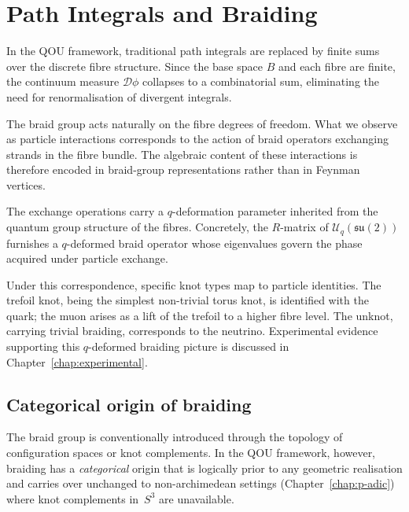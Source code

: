 \chapter{Path Integrals and Braiding}
\label{chap:path-integrals-braiding}

In the QOU framework, traditional path integrals are replaced by finite sums
over the discrete fibre structure.  Since the base space $B$ and each fibre are
finite, the continuum measure $\mathcal{D}\phi$ collapses to a combinatorial
sum, eliminating the need for renormalisation of divergent integrals.

The braid group acts naturally on the fibre degrees of freedom.  What we
observe as particle interactions corresponds to the action of braid operators
exchanging strands in the fibre bundle.  The algebraic content of these
interactions is therefore encoded in braid-group representations rather than in
Feynman vertices.

The exchange operations carry a $q$-deformation parameter inherited from the
quantum group structure of the fibres.  Concretely, the $R$-matrix of
$\mathcal{U}_q(\mathfrak{su}(2))$ furnishes a $q$-deformed braid operator
whose eigenvalues govern the phase acquired under particle exchange.

Under this correspondence, specific knot types map to particle identities.  The
trefoil knot, being the simplest non-trivial torus knot, is identified with the
quark; the muon arises as a lift of the trefoil to a higher fibre level.  The
unknot, carrying trivial braiding, corresponds to the neutrino.
Experimental evidence supporting this $q$-deformed braiding picture is
discussed in Chapter~\ref{chap:experimental}.


\section{Categorical origin of braiding}
\label{sec:categorical-braiding}

The braid group is conventionally introduced through the topology of
configuration spaces or knot complements.  In the QOU framework, however,
braiding has a \emph{categorical} origin that is logically prior to any
geometric realisation and carries over unchanged to non-archimedean settings
(Chapter~\ref{chap:p-adic}) where knot complements in~$S^3$ are unavailable.

